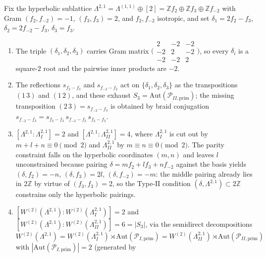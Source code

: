 \begin{lemma}
\label{lem:delta5-s3-reflection-sign-discipline}
Fix the hyperbolic sublattice $\Lambda^{2,1} = \Lambda^{(1,1)} \oplus [2]
= \mathbb{Z}f_2 \oplus \mathbb{Z}f_3 \oplus \mathbb{Z}f_{-2}$ with Gram
$(f_2, f_{-2}) = -1$, $(f_3, f_3) = 2$, and $f_2, f_{-2}$ isotropic,
and set $\delta_1 = 2f_2 - f_3$, $\delta_2 = 2f_{-2} - f_3$,
$\delta_3 = f_3$.
\begin{enumerate}
\item The triple $(\delta_1, \delta_2, \delta_3)$ carries Gram matrix
$\bigl(\begin{smallmatrix} 2 & -2 & -2 \\ -2 & 2 & -2 \\ -2 & -2 & 2
\end{smallmatrix}\bigr)$, so every $\delta_i$ is a square-$2$
root and the pairwise inner products are $-2$.
\item The reflections $s_{f_2 - f_3}$ and $s_{f_{-2} - f_2}$ act on
$\{\delta_1, \delta_2, \delta_3\}$ as the transpositions $(1\,3)$ and
$(1\,2)$, and these exhaust $S_3 = \mathrm{Aut}(\mathcal{P}_{II,
\mathrm{prim}})$; the missing transposition $(2\,3) = s_{f_{-2}-f_3}$
is obtained by braid conjugation $s_{f_{-2}-f_3} = s_{f_2-f_3}\,
s_{f_{-2}-f_2}\,s_{f_2-f_3}$.
\item $[\Lambda^{2,1} : \Lambda^{2,1}_I] = 2$ and
$[\Lambda^{2,1} : \Lambda^{2,1}_{II}] = 4$, where
$\Lambda^{2,1}_I$ is cut out by $m+l+n \equiv 0 \pmod 2$ and
$\Lambda^{2,1}_{II}$ by $m \equiv n \equiv 0 \pmod 2$. The parity
constraint falls on the hyperbolic coordinates $(m, n)$ and leaves
$l$ unconstrained because pairing $\delta = m f_2 + l f_3 + n f_{-2}$
against the basis yields $(\delta, f_2) = -n$,
$(\delta, f_3) = 2l$, $(\delta, f_{-2}) = -m$: the middle pairing
already lies in $2\mathbb{Z}$ by virtue of $(f_3, f_3) = 2$, so the
Type-II condition $(\delta, \Lambda^{2,1}) \subset 2\mathbb{Z}$
constrains only the hyperbolic pairings.
\item
$[W^{(2)}(\Lambda^{2,1}) : W^{(2)}(\Lambda^{2,1}_I)] = 2$ and
$[W^{(2)}(\Lambda^{2,1}) : W^{(2)}(\Lambda^{2,1}_{II})] = 6 = |S_3|$,
via the semidirect decompositions
$W^{(2)}(\Lambda^{2,1}) = W^{(2)}(\Lambda^{2,1}_I) \rtimes
\mathrm{Aut}(\mathcal{P}_{I,\mathrm{prim}}) = W^{(2)}(\Lambda^{2,1}_{II})
\rtimes \mathrm{Aut}(\mathcal{P}_{II,\mathrm{prim}})$ with
$|\mathrm{Aut}(\mathcal{P}_{I,\mathrm{prim}})| = 2$ (generated by

\end{enumerate}
\end{lemma}
